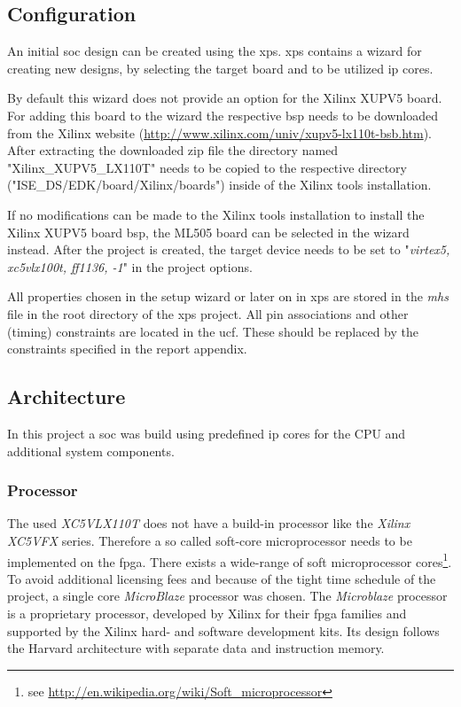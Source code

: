 \subsection{Configuration}

An initial \gls{soc} design can be created using the \gls{xps}. \gls{xps} contains a wizard for creating new designs, by selecting the target board and to be utilized  \gls{ip} cores. 

By default this wizard does not provide an option for the Xilinx XUPV5 board. For adding this board to the wizard the respective \gls{bsp} needs to be downloaded from the Xilinx website (\url{http://www.xilinx.com/univ/xupv5-lx110t-bsb.htm}). After extracting the downloaded zip file the directory named "Xilinx\_XUPV5\_LX110T" needs to be copied to the respective directory ("ISE\_DS/EDK/board/Xilinx/boards") inside of the Xilinx tools installation.

If no modifications can be made to the Xilinx tools installation to install the Xilinx XUPV5 board \gls{bsp}, the ML505 board can be selected in the wizard instead. After the project is created, the target device needs to be set to "\textit{virtex5, xc5vlx100t, ff1136, -1}" in the project options.

All properties chosen in the setup wizard or later on in \gls{xps} are stored in the \textit{\gls{mhs}} file in the root directory of the \gls{xps} project. All pin associations and other (timing) constraints are located in the \gls{ucf}. These should be replaced by the constraints specified in the report appendix.

\subsection{Architecture}

In this project a \gls{soc} was build using predefined \gls{ip} cores for the CPU and additional system components.

\subsubsection{Processor}

The used \textit{XC5VLX110T} does not have a build-in processor like the \textit{Xilinx XC5VFX} series. Therefore a so called soft-core microprocessor needs to be implemented on the \gls{fpga}. There exists a wide-range of soft microprocessor cores\footnote{see \url{http://en.wikipedia.org/wiki/Soft_microprocessor}}. To avoid additional licensing fees and because of the tight time schedule of the project, a single core \textit{MicroBlaze} processor was chosen. The \textit{Microblaze} processor is a proprietary processor, developed by Xilinx for their \gls{fpga} families and supported by the Xilinx hard- and software development kits. Its design follows the Harvard architecture with separate data and instruction memory.

